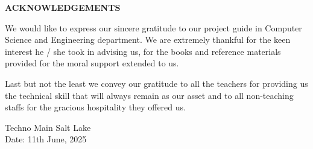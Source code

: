 
\thispagestyle{plain}

\vspace*{\fill} %

\begin{center}
    \LARGE {\bf \uppercase{Acknowledgements}}
   \end{center}
   
   \vspace{0.5\baselineskip}
   
   \noindent
   We would like to express our sincere gratitude to our project guide in Computer Science and Engineering department. We are extremely thankful for the keen interest he / she took in advising us, for the books and reference materials provided for the moral support extended to us.
   
   
   \vspace{\baselineskip}
   \noindent
   Last but not the least we convey our gratitude to all the teachers for providing us the technical skill that will always remain as our asset and to all non-teaching staffs for the gracious hospitality they offered us.

\vspace{-0.5cm}


\hspace{1.0\baselineskip}

\begin{flushright}

\vspace{2.5\baselineskip}
\textls[90]{\textbf{\mynameone ~(\myrollnoone)}}

\vspace{3\baselineskip}
\textls[90]{\textbf{\mynametwo ~(\myrollnotwo)}}

\vspace{3\baselineskip}
\textls[90]{\textbf{\mynamethree ~(\myrollnothree)}}

\vspace{3\baselineskip}
\textls[90]{\textbf{\mynamefour ~(\myrollnofour)}}

\end{flushright}



\noindent
Techno Main Salt Lake \\
Date: 11th June, 2025

\vspace*{\fill} %